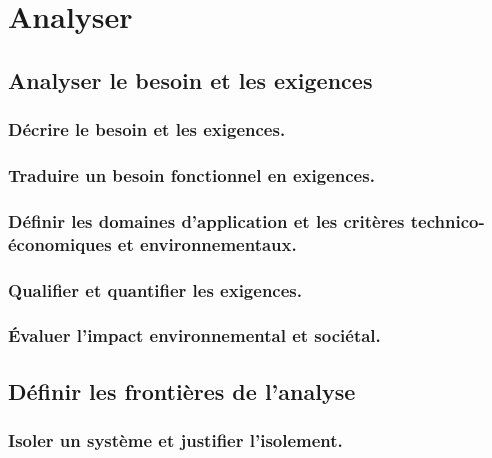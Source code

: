 \documentclass[10pt,fleqn]{book}
\newcommand{\repRel}{../..}
\newcommand{\repStyle}{\repRel/Style}
\begin{document}
\def\xxcompetences{}
\def\xxfigures{}
\graphicspath{{\repStyle/png/}}
\setlength{\columnseprule}{.1pt}

\def\xxpartie{}
\def\xxnumpartie{}
\def\xxchapitre{}
\def\xxnumchapitre{}
\def\xxactivite{DDS 3}
\def\xxtitreexo{Les ptits devoirs du soir}
\def\xxsourceexo{Xavier Pessoles}

\pagestyle{fancy}
\thispagestyle{plain}
\vspace{4.5cm}
\proffalse

\chapter{Analyser} 

\section{Analyser le besoin et les exigences} 

\subsection{Décrire le besoin et les exigences.} 

\subsection{Traduire un besoin fonctionnel en exigences.} 

\subsection{Définir les domaines d’application et les critères technico-économiques et environnementaux.} 

\subsection{Qualifier et quantifier les exigences.} 

\subsection{Évaluer l’impact environnemental et sociétal.} 

\section{Définir les frontières de l'analyse} 

\subsection{Isoler un système et justifier l’isolement.} 
\end{document}

